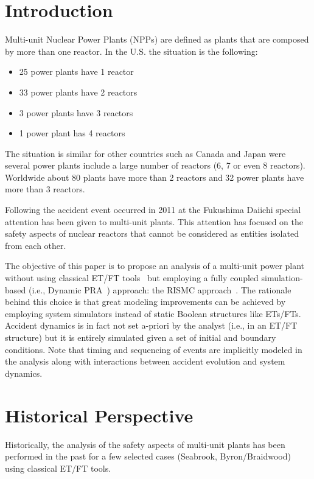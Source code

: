 \section{Introduction}
\label{sec:introduction}

Multi-unit Nuclear Power Plants (NPPs) are defined as plants that are composed by 
more than one reactor. In the U.S. the situation is the following:
\begin{itemize}
  \item 25 power plants have 1 reactor
  \item 33 power plants have 2 reactors
  \item 3 power plants have 3 reactors
  \item 1 power plant has 4 reactors
\end{itemize}
The situation is similar for other countries such as Canada and Japan were 
several power plants include a large number of reactors (6, 7 or even 8 reactors). 
Worldwide about 80 plants have more than 2 reactors and 32 power plants have more 
than 3 reactors. 

Following the accident event occurred in 2011 at the Fukushima Daiichi special 
attention has been given to multi-unit plants. This attention has focused on the 
safety aspects of nuclear reactors that cannot be considered as entities isolated 
from each other. 

The objective of this paper is to propose an analysis of a multi-unit power 
plant without using classical ET/FT tools~\cite{Nureg1150} but employing a fully 
coupled simulation-based (i.e., Dynamic PRA~\cite{DynamicReliabilityMonteCarlo}) approach: 
the RISMC approach~\cite{RISMC,mandelliNewAlgo}. 
The rationale behind this choice is that great modeling improvements can be achieved by 
employing system simulators instead of static Boolean structures like ETs/FTs. 
Accident dynamics is in fact not set a-priori by the analyst (i.e., in an ET/FT 
structure) but it is entirely simulated given a set of initial and boundary conditions. 
Note that timing and sequencing of events are implicitly modeled in the analysis along 
with interactions between accident evolution and system dynamics.

\section{Historical Perspective}
\label{sec:historicalPerspective}

Historically, the analysis of the safety aspects of multi-unit plants has been performed 
in the past for a few selected cases (Seabrook, Byron/Braidwood) using classical 
ET/FT tools. 
